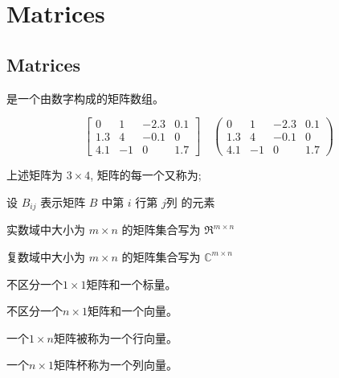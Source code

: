 \chapter{Matrices}

\section{Matrices}

\begin{definition}[矩阵]
    是一个由数字构成的矩阵数组。 

    \begin{equation} \left[\begin{array}{cccc}0 & 1 & -2.3 & 0.1 \\ 1.3 & 4 & -0.1 & 0 \\ 4.1 & -1 & 0 & 1.7\end{array}\right] \quad  \left(\begin{array}{cccc}0 & 1 & -2.3 & 0.1 \\ 1.3 & 4 & -0.1 & 0 \\ 4.1 & -1 & 0 & 1.7\end{array}\right)  \end{equation}

    上述矩阵为 $3\times 4$, 矩阵的每一个又称为;
\end{definition}

\begin{notation}
    设 $ B_{i j} $ 表示矩阵 $ B $ 中第 $ i $ 行第 $ j $列 的元素

    实数域中大小为 $ m \times n $ 的矩阵集合写为 $ \mathfrak{R}^{m \times n} $

    复数域中大小为 $ m \times n $ 的矩阵集合写为 $ \mathbb{C}^{m \times n} $
\end{notation}

\begin{definition}[标量]
    不区分一个$1\times 1$矩阵和一个标量。 
\end{definition}

\begin{definition}[向量]
    不区分一个$n\times 1$矩阵和一个向量。 
\end{definition}

\begin{definition}
    一个$1\times n$矩阵被称为一个行向量。 
    
    一个$n\times 1$矩阵杯称为一个列向量。 
\end{definition}

